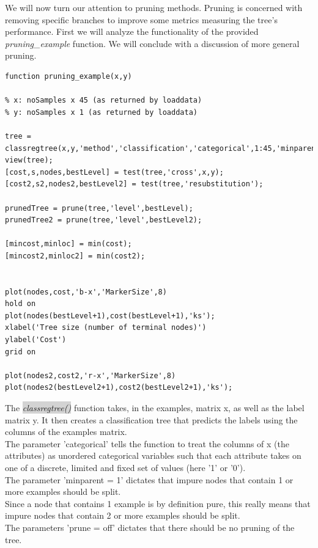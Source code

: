 We will now turn our attention to pruning methods. Pruning is concerned with removing specific branches to improve some metrics measuring
the tree's performance. First we will analyze the functionality of the provided \emph{pruning\_example} function.
We will conclude with a discussion of more general pruning.



\lstset{language=matlab}

\begin{lstlisting}
function pruning_example(x,y)
    
% x: noSamples x 45 (as returned by loaddata)
% y: noSamples x 1 (as returned by loaddata)

tree = classregtree(x,y,'method','classification','categorical',1:45,'minparent',1,'prune','off');
view(tree);
[cost,s,nodes,bestLevel] = test(tree,'cross',x,y);
[cost2,s2,nodes2,bestLevel2] = test(tree,'resubstitution');

prunedTree = prune(tree,'level',bestLevel);
prunedTree2 = prune(tree,'level',bestLevel2);

[mincost,minloc] = min(cost);
[mincost2,minloc2] = min(cost2);


plot(nodes,cost,'b-x','MarkerSize',8)
hold on
plot(nodes(bestLevel+1),cost(bestLevel+1),'ks');
xlabel('Tree size (number of terminal nodes)')
ylabel('Cost')
grid on

plot(nodes2,cost2,'r-x','MarkerSize',8)
plot(nodes2(bestLevel2+1),cost2(bestLevel2+1),'ks');
\end{lstlisting}




The \colorbox{lightgray}{\emph{classregtree()}} function takes, in the examples, matrix x, as well as the label matrix y.
It then creates a classification tree that predicts the labels using the columns of the examples matrix.\\
The parameter 'categorical' tells the function to treat the columns of x (the attributes) as unordered categorical variables
such that each attribute takes on one of a discrete, limited and fixed set of values (here '1' or '0').\\
The parameter 'minparent = 1' dictates that impure nodes that contain 1 or more examples should be split.\\
Since a node that contains 1 example is by definition pure,
this really means that impure nodes that contain 2 or more examples should be split.\\
The parameters 'prune = off' dictates that there should be no pruning of the tree.

